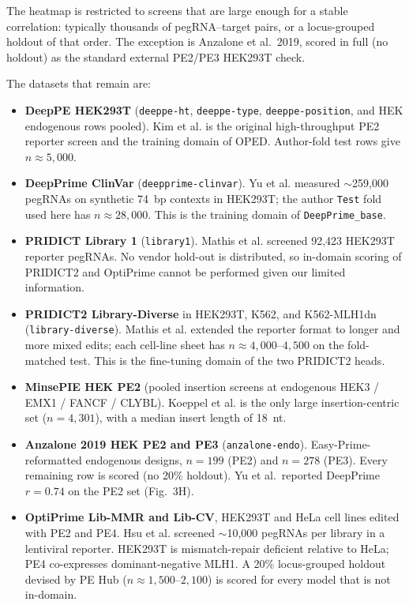 \documentclass{article}
\begin{document}
The heatmap is restricted to screens that are large enough for a stable correlation: typically thousands of pegRNA--target pairs, or a locus-grouped holdout of that order. The exception is Anzalone et al.\ 2019, scored in full (no holdout) as the standard external PE2/PE3 HEK293T check. 

The datasets that remain are:

\begin{itemize}
    \item \textbf{DeepPE HEK293T} (\nolinkurl{deeppe-ht}, \nolinkurl{deeppe-type}, \nolinkurl{deeppe-position}, and HEK endogenous rows pooled). Kim et al.\cite{kimPredictingEfficiencyPrime2021} is the original high-throughput PE2 reporter screen and the training domain of OPED. Author-fold test rows give $n \approx 5{,}000$.
    \item \textbf{DeepPrime ClinVar} (\nolinkurl{deepprime-clinvar}). Yu et al.\cite{yuPredictionEfficienciesDiverse2023} measured ${\sim}$259{,}000 pegRNAs on synthetic 74~bp contexts in HEK293T; the author \texttt{Test} fold used here has $n \approx 28{,}000$. This is the training domain of \nolinkurl{DeepPrime\_base}.
    \item \textbf{PRIDICT Library 1} (\nolinkurl{library1}). Mathis et al.\cite{schwankgeraldPredictingPrimeEditing2023} screened 92{,}423 HEK293T reporter pegRNAs. No vendor hold-out is distributed, so in-domain scoring of PRIDICT2 and OptiPrime cannot be performed given our limited information.
    \item \textbf{PRIDICT2 Library-Diverse} in HEK293T, K562, and K562-MLH1dn (\nolinkurl{library-diverse}). Mathis et al.\cite{mathisMachineLearningPrediction2024} extended the reporter format to longer and more mixed edits; each cell-line sheet has $n \approx 4{,}000$--$4{,}500$ on the fold-matched test. This is the fine-tuning domain of the two PRIDICT2 heads.
    \item \textbf{MinsePIE HEK PE2} (pooled insertion screens at endogenous HEK3 / EMX1 / FANCF / CLYBL). Koeppel et al.\cite{koeppelPredictionPrimeEditing2023} is the only large insertion-centric set ($n = 4{,}301$), with a median insert length of 18~nt.
    \item \textbf{Anzalone 2019 HEK PE2 and PE3} (\nolinkurl{anzalone-endo}). Easy-Prime-reformatted endogenous designs, $n = 199$ (PE2) and $n = 278$ (PE3). Every remaining row is scored (no 20\% holdout). Yu et al.\ reported DeepPrime $r = 0.74$ on the PE2 set (Fig.~3H).
    \item \textbf{OptiPrime Lib-MMR and Lib-CV}, HEK293T and HeLa cell lines edited with PE2 and PE4. Hsu et al.\cite{hsuMechanisticMachineLearning2026} screened ${\sim}$10{,}000 pegRNAs per library in a lentiviral reporter. HEK293T is mismatch-repair deficient relative to HeLa; PE4 co-expresses dominant-negative MLH1. A 20\% locus-grouped holdout devised by PE Hub ($n \approx 1{,}500$--$2{,}100$) is scored for every model that is not in-domain.
\end{itemize}
\end{document}
